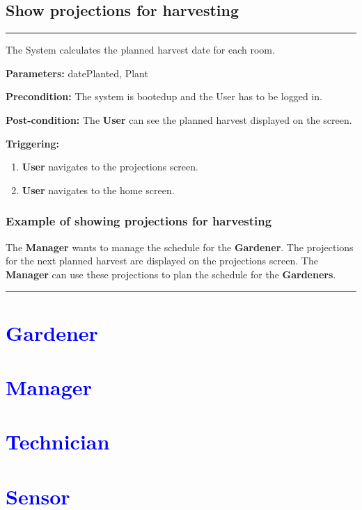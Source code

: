 \subsection{Show projections for harvesting}
\hrule
\hfill
\vspace{0.5cm}
\label{operation:Show projections for harvesting}

The System calculates the planned harvest date for each room.

\begin{description}

\item \textbf{Parameters:} datePlanted, Plant
\item \textbf{Precondition:} The system is bootedup and the User has to be
logged in.
\item \textbf{Post-condition:} The \textbf{User} can see the planned harvest displayed on the screen.
\item \textbf{Triggering:}
\begin{enumerate}

\item \textbf{User} navigates to the projections screen.
\item \textbf{User} navigates to the home screen.

\end{enumerate}
\end{description}

\subsubsection{Example of showing projections for harvesting}
The \textbf{Manager} wants to manage the schedule for the \textbf{Gardener}. The projections for the next planned harvest are displayed on the projections screen. 
The \textbf{Manager} can use these projections to plan the schedule for the \textbf{Gardeners}.
\hfill
\vspace{0.5cm}
\hrule

\break
\section{\textcolor{blue}{\textbf{Gardener}}}

\break

\section{\textcolor{blue}{\textbf{Manager}}}

\break

\section{\textcolor{blue}{\textbf{Technician}}}

\break

\section{\textcolor{blue}{\textbf{Sensor}}}

\break

